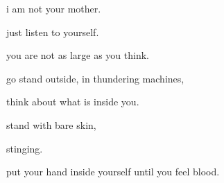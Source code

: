 \documentclass[extrafontsizes, 48pt]{memoir}
\newcommand\blankpage{%
    \null
    \thispagestyle{empty}%
    \addtocounter{page}{-1}%
    \newpage}
\begin{document}
	\begin{minipage}{.6\textwidth}
	i am not your mother.
	\afterpage{\blankpage}
	\end{minipage}
	\newpage

	\begin{minipage}{.6\textwidth}
	just listen to yourself.
	\end{minipage}
	\newpage

	\begin{minipage}{.6\textwidth}
	you are not as large as you think.
	\end{minipage}
	\newpage

	\begin{minipage}{.6\textwidth}
	go stand outside, in thundering machines,
	\end{minipage}
	\newpage

	\begin{minipage}{.6\textwidth}
	think about what is inside you.
	\afterpage{\blankpage}
	\end{minipage}
	\newpage

	\begin{minipage}{.6\textwidth}
	stand with bare skin, 
	\end{minipage}
	\newpage

	\begin{minipage}{.6\textwidth}
	stinging.
	\end{minipage}
	\newpage

	\begin{minipage}{.6\textwidth}
	put your hand inside yourself until you feel blood.
	\end{minipage}
	\newpage
\end{document}
